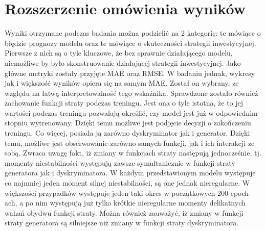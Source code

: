 \documentclass[11pt]{article} %
\begin{document}
\section{Rozszerzenie omówienia wyników}
Wyniki otrzymane podczas badania można podzielić na 2 kategorię: te mówiące o błędzie prognozy modelu oraz te mówiące o skuteczności strategii inwestycyjnej. Pierwsze z nich są o tyle kluczowe, że bez sprawnie działającego modelu, niemożliwe by było skonstruowanie działającej strategii inwestycyjnej. Jako główne metryki zostały przyjęte MAE oraz RMSE.  W badaniu jednak, wykresy jak i większość wyników opiera się na samym MAE. Został on wybrany, ze względu na łatwą interpretowalność tego wskaźnika. Sprawdzone zostało również zachowanie funkcji straty podczas treningu. Jest ona o tyle istotna, że to jej wartości podczas treningu pozwalają określić, czy model jest już w odpowiednim stopniu wytrenowany. Dzięki temu możliwe jest podjęcie decyzji o zakończeniu treningu. Co więcej, posiada ją zarówno dyskryminator jak i generator.  Dzięki temu, możliwe jest obserwowanie zarówno samych funkcji, jak i ich interakcji ze sobą. Zwraca uwagę fakt, iż zmiany w funkcjach straty następują jednocześnie, tj. momenty niestabilności występują zawsze symultanicznie w funkcji straty generatora jak i dyskryminatora. W każdym przedstawionym modelu występuje co najmniej jeden moment silnej niestabilności, są one jednak nieregularne. W większości przypadków występuje jeden taki okres w początkowych 200 epoch-ach, a po nim występują już tylko krótkie nieregularne momenty delikatnych wahań obydwu funkcji straty. Można również zauważyć, iż zmiany w funkcji straty generatora są silniejsze niż zmiany w funkcji straty dyskryminatora. 
\end{document}
